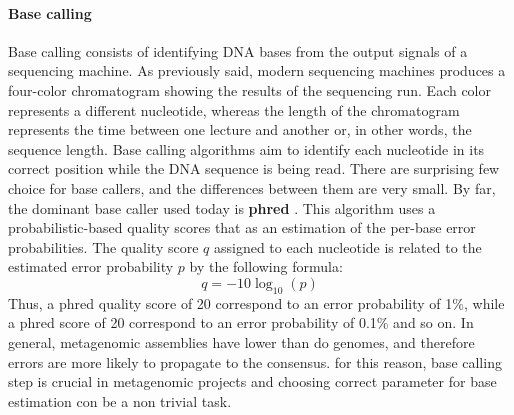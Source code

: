 \paragraph{Base calling}
Base calling consists of identifying DNA bases from the output signals of a sequencing machine. As previously said, modern sequencing machines produces a four-color chromatogram showing the results of the sequencing run. Each color represents a different nucleotide, whereas the length of the chromatogram represents the time between one lecture and another or, in other words, the sequence length. Base calling algorithms aim to identify each nucleotide in its correct position while the DNA sequence is being read. There are surprising few choice for base callers, and the differences between them are very small. By far, the dominant base caller used today is \textbf{phred} \cite{ewing1998base}. This algorithm uses a probabilistic-based quality scores that as an estimation of the per-base error probabilities. The quality score $q$ assigned to each nucleotide is related to the estimated error probability $p$ by the following formula:\\
\begin{equation*}
q = -10 \log_{10}(p)
\end{equation*}
Thus, a phred quality score of 20 correspond to an error probability of 1\%, while a phred score of 20 correspond to an error probability of 0.1\% and so on. In general, metagenomic assemblies have lower than do genomes, and therefore errors are more likely to propagate to the consensus. for this reason, base calling step is crucial in metagenomic projects and choosing correct parameter for base estimation con be a non trivial task.\\

